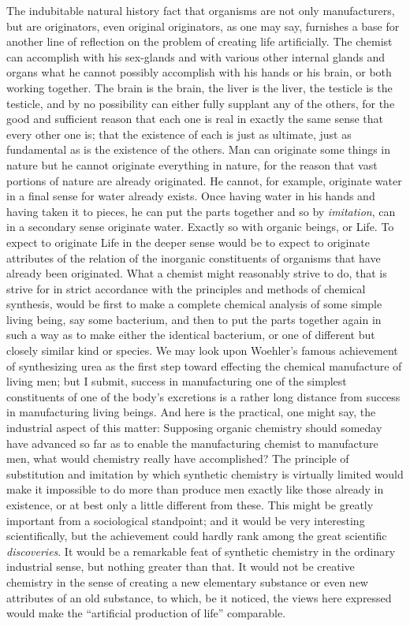 \documentclass[a4paper, 11pt, oneside, polutonikogreek, english]{article}
\begin{document}
The indubitable natural history fact that organisms are not only manufacturers, but are originators, even original originators, as one may say, furnishes a base for another line of reflection on the problem of creating life artificially. The chemist can accomplish with his sex-glands and with various other internal glands and organs what he cannot possibly accomplish with his hands or his brain, or both working together. The brain is the brain, the liver is the liver, the testicle is the testicle, and by no possibility can either fully supplant any of the others, for the good and sufficient reason that each one is real in exactly the same sense that every other one is; that the existence of each is just as ultimate, just as fundamental as is the existence of the others. Man can originate some things in nature but he cannot originate everything in nature, for the reason that vast portions of nature are already originated. He cannot, for example, originate water in a final sense for water already exists. Once having water in his hands and having taken it to pieces, he can put the parts together and so by \emph{imitation}, can in a secondary sense originate water. Exactly so with organic beings, or Life. To expect to originate Life in the deeper sense would be to expect to originate attributes of the relation of the inorganic constituents of organisms that have already been originated. What a chemist might reasonably strive to do, that is strive for in strict accordance with the principles and methods of chemical synthesis, would be first to make a complete chemical analysis of some simple living being, say some bacterium, and then to put the parts together again in such a way as to make either the identical bacterium, or one of different but closely similar kind or species. We may look upon Woehler's famous achievement of synthesizing urea as the first step toward effecting the chemical manufacture of living men; but I submit, success in manufacturing one of the simplest constituents of one of the body's excretions is a rather long distance from success in manufacturing living beings. And here is the practical, one might say, the industrial aspect of this matter: Supposing organic chemistry should someday have advanced so far as to enable the manufacturing chemist to manufacture men, what would chemistry really have accomplished? The principle of substitution and imitation by which synthetic chemistry is virtually limited would make it impossible to do more than produce men exactly like those already in existence, or at best only a little different from these. This might be greatly important from a sociological standpoint; and it would be very interesting scientifically, but the achievement could hardly rank among the great scientific \emph{discoveries}. It would be a remarkable feat of synthetic chemistry in the ordinary industrial sense, but nothing greater than that. It would not be creative chemistry in the sense of creating a new elementary substance or even new attributes of an old substance, to which, be it noticed, the views here expressed would make the ``artificial production of life'' comparable.
\end{document}
